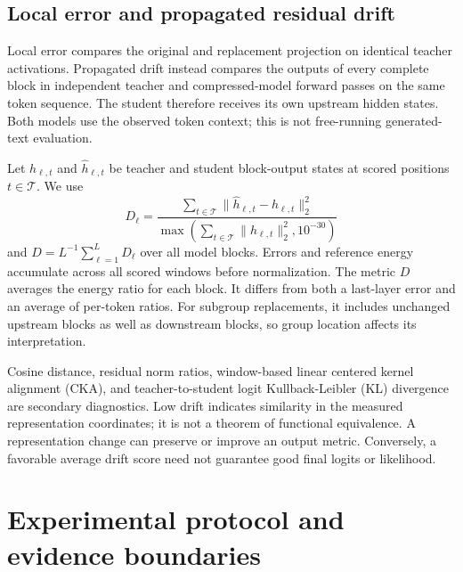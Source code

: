\documentclass[conference]{IEEEtran}
\begin{document}
\subsection{Local error and propagated residual drift}
Local error compares the original and replacement projection on identical teacher activations. Propagated drift instead compares the outputs of every complete block in independent teacher and compressed-model forward passes on the same token sequence. The student therefore receives its own upstream hidden states. Both models use the observed token context; this is not free-running generated-text evaluation.\par\smallskip
Let $h_{\ell,t}$ and $\widehat h_{\ell,t}$ be teacher and student block-output states at scored positions $t\in\mathcal{T}$. We use
\begin{equation}D_\ell=\frac{\sum_{t\in\mathcal{T}}\|\widehat h_{\ell,t}-h_{\ell,t}\|_2^2}{\max(\sum_{t\in\mathcal{T}}\|h_{\ell,t}\|_2^2,10^{-30})}\end{equation}
 and $D=L^{-1}\sum_{\ell=1}^{L}D_\ell$ over all model blocks. Errors and reference energy accumulate across all scored windows before normalization. The metric $D$ averages the energy ratio for each block. It differs from both a last-layer error and an average of per-token ratios. For subgroup replacements, it includes unchanged upstream blocks as well as downstream blocks, so group location affects its interpretation.\par\smallskip
Cosine distance, residual norm ratios, window-based linear centered kernel alignment (CKA), and teacher-to-student logit Kullback-Leibler (KL) divergence are secondary diagnostics. Low drift indicates similarity in the measured representation coordinates; it is not a theorem of functional equivalence. A representation change can preserve or improve an output metric. Conversely, a favorable average drift score need not guarantee good final logits or likelihood.\par\smallskip
\section{Experimental protocol and evidence boundaries}
\end{document}
